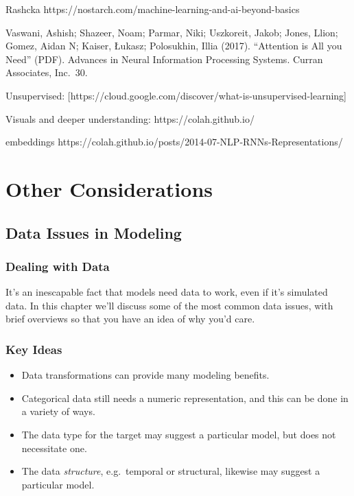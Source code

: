 \documentclass[
  letterpaper,
]{krantz}
\providecommand{\tightlist}{%
  \setlength{\itemsep}{0pt}\setlength{\parskip}{0pt}}\usepackage{longtable,booktabs,array}
\begin{document}
Rashcka https://nostarch.com/machine-learning-and-ai-beyond-basics

Vaswani, Ashish; Shazeer, Noam; Parmar, Niki; Uszkoreit, Jakob; Jones,
Llion; Gomez, Aidan N; Kaiser, Łukasz; Polosukhin, Illia (2017).
``Attention is All you Need'' (PDF). Advances in Neural Information
Processing Systems. Curran Associates, Inc.~30.

Unsupervised:
{[}https://cloud.google.com/discover/what-is-unsupervised-learning{]}

Visuals and deeper understanding: https://colah.github.io/

embeddings
https://colah.github.io/posts/2014-07-NLP-RNNs-Representations/

\part{Other Considerations}

\chapter{Data Issues in Modeling}\label{data-issues-in-modeling}

\section{Dealing with Data}\label{dealing-with-data}

It's an inescapable fact that models need data to work, even if it's
simulated data. In this chapter we'll discuss some of the most common
data issues, with brief overviews so that you have an idea of why you'd
care.

\section{Key Ideas}\label{key-ideas-6}

\begin{itemize}
\tightlist
\item
  Data transformations can provide many modeling benefits.
\item
  Categorical data still needs a numeric representation, and this can be
  done in a variety of ways.
\item
  The data type for the target may suggest a particular model, but does
  not necessitate one.
\item
  The data \emph{structure}, e.g.~temporal or structural, likewise may
  suggest a particular model.
\end{itemize}
\end{document}
